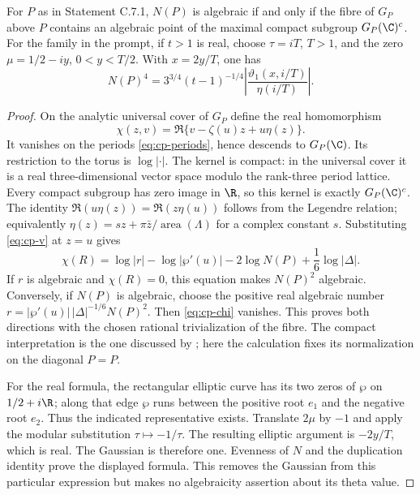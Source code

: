 \begin{statement}
For $P$ as in Statement C.7.1, $N(P)$ is algebraic if and only
if the fibre of $G_P$ above $P$ contains an algebraic point of
the maximal compact subgroup $G_P(\C)^c$.
For the family in the prompt, if $t>1$ is real, choose
$\tau=iT$, $T>1$, and the zero $\mu=1/2-iy$, $0<y<T/2$.
With $x=2y/T$, one has
\[
 N(P)^4=3^{3/4}(t-1)^{-1/4}
       \left|\frac{\vartheta_1(x,i/T)}{\eta(i/T)}\right|.
\]
\end{statement}
\begin{proof}
On the analytic universal cover of $G_P$ define the real
homomorphism
\[
 \chi(z,v)=\Re\{v-\zeta(u)z+u\eta(z)\}.
\]
It vanishes on the periods \eqref{eq:cp-periods}, hence descends
to $G_P(\C)$. Its restriction to the torus is $\log|\cdot|$.
The kernel is compact: in the universal cover it is a real
three-dimensional vector space modulo the rank-three period
lattice. Every compact subgroup has zero image in $\R$, so
this kernel is exactly $G_P(\C)^c$.
The identity
$\Re(u\eta(z))=\Re(z\eta(u))$ follows from the Legendre relation;
equivalently $\eta(z)=sz+\pi\bar z/\operatorname{area}(\Lambda)$
for a complex constant $s$. Substituting
\eqref{eq:cp-v} at $z=u$ gives
\begin{equation}\label{eq:cp-chi}
 \chi(R)=\log|r|-\log|\wp'(u)|
            -2\log N(P)+\frac16\log|\Delta|.
\end{equation}
If $r$ is algebraic and $\chi(R)=0$, this equation makes
$N(P)^2$ algebraic. Conversely, if $N(P)$ is algebraic,
choose the positive real algebraic number
$r=|\wp'(u)|\,|\Delta|^{-1/6}N(P)^2$.
Then \eqref{eq:cp-chi} vanishes. This proves both directions
with the chosen rational trivialization of the fibre.
The compact interpretation is the one discussed by
\citet[slides 5--8]{bertrand2017}; here the calculation fixes
its normalization on the diagonal $P=P$.

For the real formula, the rectangular elliptic curve has its
two zeros of $\wp$ on $1/2+i\R$; along that edge $\wp$ runs
between the positive root $e_1$ and the negative root $e_2$.
Thus the indicated representative exists. Translate $2\mu$
by $-1$ and apply the modular substitution $\tau\mapsto-1/\tau$.
The resulting elliptic argument is $-2y/T$, which is real.
The Gaussian is therefore one. Evenness of $N$ and the
duplication identity prove the displayed formula. This removes
the Gaussian from this particular expression but makes no
algebraicity assertion about its theta value.
\end{proof}
